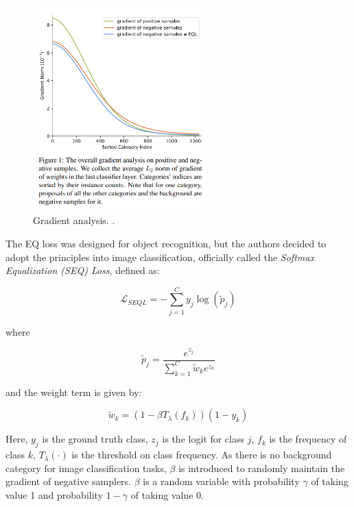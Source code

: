\begin{figure}[ht]
    \centering
    \includegraphics[width=0.6\textwidth]{Images/gradient_analysis.png} 
    \caption{Gradient analysis. \cite{tan2020equalizationlosslongtailedobject}.}
    \label{fig:eql_gradients} 
\end{figure}

The EQ loss was designed for object recognition, but the authors decided to adopt the principles into image classification, officially called the \emph{Softmax Equalization (SEQ) Loss}, defined as: 

\begin{equation}
    \label{eq:EQ_loss}
    \mathcal{L}_{SEQL} = - \sum_{j=1}^{C} y_j \log(\tilde{p}_j)
\end{equation}

where

\begin{equation}
    \tilde{p}_j = \frac{e^{z_j}}{\sum_{k=1}^{C} \tilde{w}_k e^{z_k}}
\end{equation}

and the weight term is given by:

\begin{equation}
    \tilde{w}_k = (1 - \beta T_\lambda(f_k))(1 - y_k)
\end{equation}

Here, $y_j$ is the ground truth class, $z_j$ is the logit for class $j$, $f_k$ is the frequency of class $k$, \(T_\lambda(\cdot)\) is the threshold on class frequency. As there is no background category for image classification tasks, $\beta$ is introduced to randomly maintain the gradient of negative samplers. \(\beta\) is a random variable with probability \(\gamma\) of taking value 1 and probability \(1 - \gamma\) of taking value 0.




